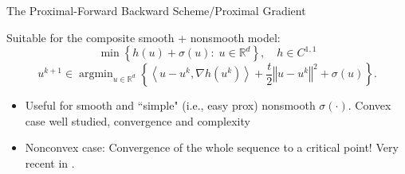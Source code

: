 \documentclass[9pt,handout]{beamer} %
\newcommand{\gap}{\vspace{0.1in}}
\newcommand{\s}{\sigma}
\newcommand{\rr}{\mathbb{R}} %
\newcommand{\norm}[1]{\left\Vert {#1} \right\Vert} %
\newcommand{\act}[1]{\left\langle {#1} \right\rangle} %
\newcommand{\argmin}{\operatorname{argmin}}
\begin{document}
	\begin{frame}{The Proximal-Forward Backward Scheme/Proximal Gradient}

		Suitable for the composite smooth + nonsmooth model:
 		\begin{equation*}
 			\min \left\{ h\left(u\right) + \s\left(u\right) : \; u \in \rr^{d} \right\}, 		
 			\quad h \in C^{1,1}
 		\end{equation*}
    	\begin{equation*}
    		u^{k + 1} \in \argmin_{u \in \rr^{d}} \left\{ \act{u - u^{k} , \nabla 
    		h\left(u^{k}\right)} + \frac{t}{2}\norm{u - u^{k}}^{2} + \s\left(u\right) 
    		\right\}.
    	\end{equation*}
		\begin{itemize}
			\item Useful for smooth and ``simple" (i.e., easy prox) nonsmooth $\s(\cdot)$. 
				Convex case well studied, convergence and complexity {\footnotesize{}} \medskip \pause
	    	\item Nonconvex case: Convergence of the whole sequence to a critical point! Very 
		    	recent in {\footnotesize{}.}
    	\end{itemize}
	    \pause
    	\gap
		\begin{center}
	    \end{center}
	\end{frame}
    
\end{document}
